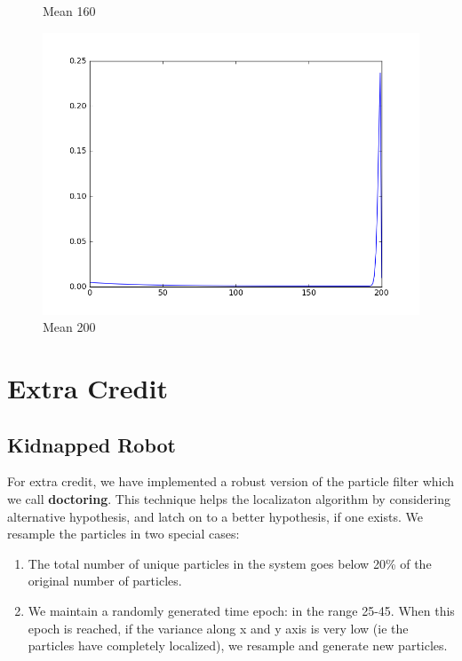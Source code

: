 \documentclass{article}
\begin{document}
\begin{figure}[!hb]
\begin{minipage}[b]{0.4\textwidth}
  \caption{Mean 160}
 \end{minipage}
 \hfill
 \begin{minipage}[b]{0.4\textwidth}
  \includegraphics[width=\textwidth]{sensor_model_11.png}
  \caption{Mean 200}
 \end{minipage}

\end{figure}

\section{Extra Credit}

\subsection{Kidnapped Robot}

For extra credit, we have implemented a robust version of the particle filter which we call \textbf{doctoring}. This technique helps the localizaton algorithm by considering alternative hypothesis, and latch on to a better hypothesis, if one exists.
We resample the particles in two special cases:
\begin{enumerate}
 \item The total number of unique particles in the system goes below 20\% of the original number of particles.
 \item We maintain a randomly generated time epoch: in the range 25-45. When this epoch is reached, if the variance along x and y axis is very low (ie the particles have completely localized), we resample and generate new particles.
\end{enumerate}
\end{document}
